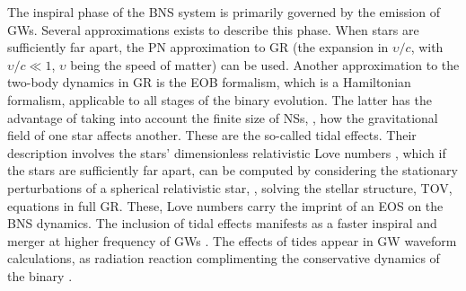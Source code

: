 The inspiral phase of the \ac{BNS} system is primarily governed by the emission 
of \acp{GW}. Several approximations exists to describe this phase.
When stars are sufficiently far apart, the \ac{PN} approximation to \ac{GR} 
(the expansion in $\upsilon/c$, with $\upsilon/c\ll 1$, $\upsilon$ 
being the speed of matter) can be used. 
Another approximation to the two-body dynamics in \ac{GR} is the \ac{EOB} formalism,
which is a Hamiltonian formalism, applicable to all stages of the binary evolution.
%
The latter has the advantage of taking into account the finite size of \acp{NS}, \ie, 
how the gravitational field of one star affects another. 
These are the so-called tidal effects. 
Their description involves the stars' dimensionless relativistic Love numbers \citep{Damour:2009vw,Binnington:2009bb}, which 
if the stars are sufficiently far apart, 
can be computed by considering the stationary perturbations 
of a spherical relativistic star, \ie, solving the stellar structure, 
\ac{TOV}, equations in full \ac{GR}.
These, Love numbers carry the imprint of an \ac{EOS} on the \ac{BNS} dynamics.
%
The inclusion of tidal effects manifests as a faster inspiral and merger at higher 
frequency of \acp{GW} \citep{Damour:2009wj}.
%
The effects of tides appear in \ac{GW} waveform calculations, as radiation reaction 
complimenting the conservative dynamics of the binary \citep{Damour:2008gu}. 



